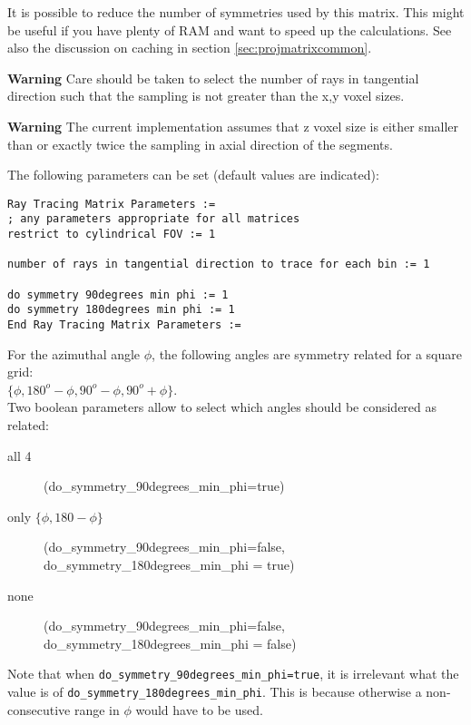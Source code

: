 \documentclass{article}
\begin{document}
It is possible to reduce the number of symmetries used by this 
matrix. This might be useful if you have plenty of RAM and want 
to speed up the calculations. See also the discussion on caching 
in section \ref{sec:projmatrixcommon}.

\textbf{Warning} Care should be taken to select the number of rays 
in tangential direction such that the sampling is not greater 
than the x,y voxel sizes.

\textbf{Warning} The current implementation assumes that z voxel size 
is either smaller than or exactly twice the sampling in axial 
direction of the segments.

{ 
}

The following parameters can be set (default values are indicated):

\begin{verbatim}
Ray Tracing Matrix Parameters := 
; any parameters appropriate for all matrices
restrict to cylindrical FOV := 1

number of rays in tangential direction to trace for each bin := 1

do symmetry 90degrees min phi := 1 
do symmetry 180degrees min phi := 1
End Ray Tracing Matrix Parameters :=
\end{verbatim}

For the azimuthal angle $\phi$, the following angles are symmetry 
related for a square grid: \\
$\{\phi, 180^{o}-\phi, 90^{o}-\phi, 90^{o}+\phi\}$.\\
Two boolean parameters allow to select which angles should be 
considered as related:
\begin{description}
\item[all 4]
(do\_symmetry\_90degrees\_min\_phi=true)
\item[only $\{ \phi, 180- \phi \}$]
(do\_symmetry\_90degrees\_min\_phi=false,  \\
do\_symmetry\_180degrees\_min\_phi = true)
\item[none]
(do\_symmetry\_90degrees\_min\_phi=false, \\
do\_symmetry\_180degrees\_min\_phi = false)
\end{description}

Note that when \texttt{do\_symmetry\_90degrees\_min\_phi=true}, 
it is irrelevant what the value is 
of \texttt{do\_symmetry\_180degrees\_min\_phi}. This is because 
otherwise a non-consecutive range in $\phi$ would have to be used.
\end{document}
